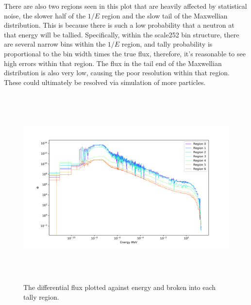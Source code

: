 There are also two regions seen in this plot that are heavily affected by statistical noise, the slower half of the $1/E$ region and the slow tail of the Maxwellian distribution.
This is because there is such a low probability that a neutron at that energy will be tallied.
Specifically, within the scale252 bin structure, there are several narrow bins within the $1/E$ region, and tally probability is proportional to the bin width times the true flux, therefore, it's reasonable to see high errors within that region.
The flux in the tail end of the Maxwellian distribution is also very low, causing the poor resolution within that region.
These could ultimately be resolved via simulation of more particles.



%
\begin{figure}[htb]
\centering
\includegraphics[height=4in]{tex/figures/flux_rad_erg.png}
\caption[Regional Flux vs. Energy]{The differential flux plotted against energy and broken into each tally region.}
\label{fig:flux_rad_erg}
\end{figure}

